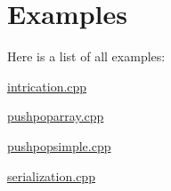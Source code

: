 \section{Examples}
Here is a list of all examples\+:\begin{DoxyCompactItemize}
\item 
\mbox{\hyperlink{intrication_8cpp-example}{intrication.\+cpp}}
\item 
\mbox{\hyperlink{pushpoparray_8cpp-example}{pushpoparray.\+cpp}}
\item 
\mbox{\hyperlink{pushpopsimple_8cpp-example}{pushpopsimple.\+cpp}}
\item 
\mbox{\hyperlink{serialization_8cpp-example}{serialization.\+cpp}}
\end{DoxyCompactItemize}
